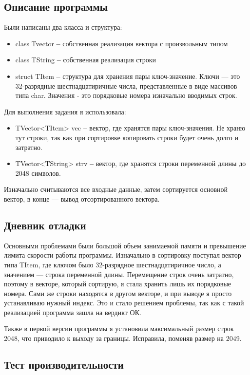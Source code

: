 \documentclass[12pt]{article}
\begin{document}
\subsection*{Описание программы}
Были написаны два класса и структура:
\begin{itemize}
\item class Tvector \textbf{--} собственная реализация вектора с произвольным типом
\item class TString \textbf{--} собственная реализация строки
\item struct TItem \textbf{--} структура для хранения пары ключ-значение. Ключи — это 32-разрядные шестнадцатиричные числа, представленные в виде массивов типа char. Значения - это порядковые номера изначально вводимых строк.
\end{itemize}

Для выполнения задания я использовала:
\begin{itemize}
\item TVector<TItem> vec \textbf{--} вектор, где хранятся пары ключ-значения. Не храню тут строки, так как при сортировке копировать строки будет очень долго и затратно.

\item TVector<TString> strv \textbf{--} вектор, где хранятся строки переменной длины до 2048 символов. 
\end{itemize}
Изначально считываются все входные данные, затем сортируется основной вектор, в конце — вывод отсортированного вектора.

\subsection*{Дневник отладки}

Основными проблемами были большой объем занимаемой памяти и превышение лимита скорости работы программы. Изначально в сортировку поступал вектор типа TItem, где ключом было 32-разрядное шестнадцатиричное число, а значением — строка переменной длины. Перемещение строк очень затратно, поэтому в векторе, который сортирую, я стала хранить лишь их порядковые номера. Сами же строки находятся в другом векторе, и при выводе я просто устанавливаю нужный индекс. Это и стало решением проблемы, так как с такой реализацией программа зашла на вердикт ОК.

Также в первой версии программы я установила максимальный размер строк 2048, что приводило к выходу за границы. Исправила, поменяв размер на 2049.

\subsection*{Тест производительности}
\end{document}
